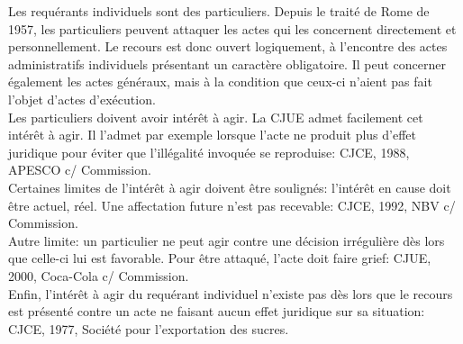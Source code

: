 \documentclass[10pt, a4paper, openany]{book}
\begin{document}
Les requérants individuels sont des particuliers. Depuis le traité de Rome de 1957, les particuliers peuvent attaquer les actes qui les concernent directement et personnellement. Le recours est donc ouvert logiquement, à l'encontre des actes administratifs individuels présentant un caractère obligatoire. Il peut concerner également les actes généraux, mais à la condition que ceux-ci n'aient pas fait l'objet d'actes d'exécution. \\
Les particuliers doivent avoir intérêt à agir. La CJUE admet facilement cet intérêt à agir. Il l'admet par exemple lorsque l'acte ne produit plus d'effet juridique pour éviter que l'illégalité invoquée se reproduise: CJCE, 1988, APESCO c/ Commission. \\
Certaines limites de l'intérêt à agir doivent être soulignés: l'intérêt en cause doit être actuel, réel. Une affectation future n'est pas recevable: CJCE, 1992, NBV c/ Commission. \\
Autre limite: un particulier ne peut agir contre une décision irrégulière dès lors que celle-ci lui est favorable. Pour être attaqué, l'acte doit faire grief: CJUE, 2000, Coca-Cola c/ Commission. \\
Enfin, l'intérêt à agir du requérant individuel n'existe pas dès lors que le recours est présenté contre un acte ne faisant aucun effet juridique sur sa situation: CJCE, 1977, Société pour l'exportation des sucres.
\end{document}
